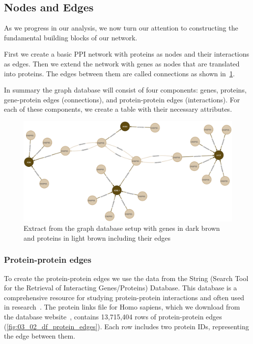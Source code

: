 \subsection{Nodes and Edges} \label{subsec:nodes_and_edges}
As we progress in our analysis, we now turn our attention to constructing the fundamental building blocks of our network.

First we create a basic PPI network with proteins as nodes and their interactions as edges.
Then we extend the network with genes as nodes that are translated into proteins.
The edges between them are called connections as shown in~\cref{fig:03_02_Network}.

In summary the graph database will consist of four components: genes, proteins,
gene-protein edges (connections), and protein-protein edges (interactions).
For each of these components, we create a table with their necessary attributes.


\begin{figure}[!h]
    \centering
    \includegraphics[width=1\textwidth]{figures/03_02_Network_2}
    \caption{Extract from the graph database setup with genes in dark brown and proteins in light brown including their edges}
    \label{fig:03_02_Network}
\end{figure}



\subsubsection*{Protein-protein edges} \label{subsubsec:protein_protein_edges}
To create the protein-protein edges we use the data from the String (Search Tool for the Retrieval of Interacting Genes/Proteins) Database.
This database is a comprehensive resource for studying protein-protein interactions and often used in research~\cite{Szklarczyk2020String}.
The protein links file for Homo sapiens, which we download from the database website~\cite{string_download},
contains 13,715,404 rows of protein-protein edges (\cref{fig:03_02_df_protein_edges}).
Each row includes two protein IDs, representing the edge between them.

